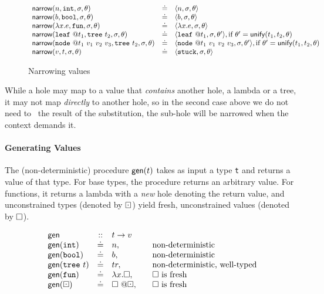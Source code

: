 \begin{figure*}[t]
$$\begin{array}{lcl}
\mathsf{narrow}(n, \mathtt{int}, \sigma, \theta)     & \doteq & \langle n, \sigma, \theta \rangle \\
\mathsf{narrow}(b, \mathtt{bool}, \sigma, \theta)    & \doteq & \langle b, \sigma, \theta \rangle \\
\mathsf{narrow}(\lambda x. e, \mathtt{fun}, \sigma, \theta) & \doteq & \langle \lambda x. e, \sigma, \theta \rangle \\
\mathsf{narrow}(\mathtt{leaf}\ @t_1, \mathtt{tree}\ t_2, \sigma, \theta) & \doteq & \langle \mathtt{leaf}\ @t_1, \sigma, \theta' \rangle, \mbox{if}\ \theta' = \mathsf{unify}(t_1,t_2,\theta) \\
\mathsf{narrow}(\mathtt{node}\ @t_1\ v_1\ v_2\ v_3, \mathtt{tree}\ t_2, \sigma, \theta) & \doteq & \langle \mathtt{node}\ @t_1\ v_1\ v_2\ v_3, \sigma, \theta' \rangle, \mbox{if}\ \theta' = \mathsf{unify}(t_1,t_2,\theta) \\
\mathsf{narrow}(v, t, \sigma, \theta) & \doteq & \langle \mathtt{stuck}, \sigma, \theta \rangle
\end{array}
$$
\caption{Narrowing values}
\label{fig:narrow}
\end{figure*}
%
While a hole may map to a value that \emph{contains} another hole, \eg a
lambda or a tree, it may not map \emph{directly} to another hole, so in
the second case above we do not need to \forcesym\ the result of the
substitution, the sub-hole will be narrowed when the context demands it.

\paragraph{Generating Values} The (non-deterministic) procedure $\mathsf{gen}(t)$
takes as input a type \texttt{t} and returns a value of that type. For base
types, the procedure returns an arbitrary value. For functions, it returns
a lambda with a \emph{new} hole denoting the return value, and unconstrained
types (denoted by $\boxdot$) yield fresh, unconstrained values
(denoted by $\square$).

$$
\begin{array}{lcll}
\gensym       & ::      & t \rightarrow v \\
\gen{\tint}   & \defeq  & n, & \quad \text{non-deterministic} \\
\gen{\tbool}  & \defeq  & b, & \quad \text{non-deterministic} \\
\gen{\ttree{t}}  & \defeq  & tr, & \quad \text{non-deterministic, well-typed} \\
\gen{\tfun}   & \defeq & \efun{x}{\ehole}, & \quad \text{\ehole is fresh} \\
\gen{\thole}  & \defeq & \vhole{\thole}, & \quad \text{\ehole is fresh} \\
\end{array}
$$

